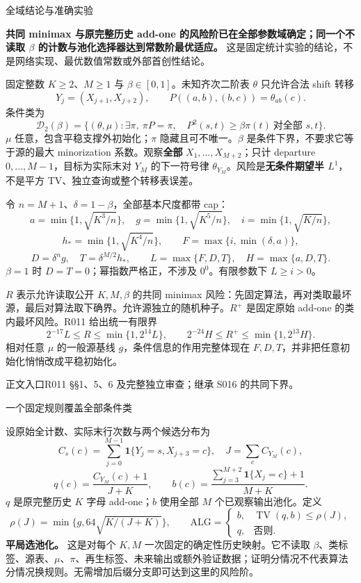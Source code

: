 \documentclass[11pt,a4paper]{article}
\newcommand{\TV}{\operatorname{TV}}\newcommand{\E}{\mathbb E}\newcommand{\Prob}{\mathbb P}
\newcommand{\head}[2]{{\small\sffamily #1}\par\vspace{2pt}{\LARGE\bfseries #2}\par\vspace{5pt}}
\newcommand{\entry}[1]{\vfill{\noindent\small\raggedright 正文入口\quad #1\par}}
\begin{document}
\head{全域结论与准确实验}{二阶条件预测的全参数风险}
\textbf{共同 minimax 与原完整历史 add-one 的风险阶已在全部参数域确定；同一个不读取 $\beta$ 的计数与池化选择器达到常数阶最优适应。} 这是固定统计实验的结论，不是网络实现、最优数值常数或外部首创性结论。

固定整数 $K\ge2$、$M\ge1$ 与 $\beta\in[0,1]$。未知齐次二阶表 $\theta$ 只允许合法 shift 转移
\[
 Y_j=(X_{j+1},X_{j+2}),\qquad P((a,b),(b,c))=\theta_{ab}(c).
\]
条件类为
\[
 \mathcal D_2(\beta)=\{(\theta,\mu):\exists\pi,\ \pi P=\pi,\quad
 P^2(s,t)\ge\beta\pi(t)\ \text{对全部 }s,t\}.
\]
$\mu$ 任意，包含平稳支撑外初始化；$\pi$ 隐藏且可不唯一。$\beta$ 是条件下界，不要求它等于源的最大 minorization 系数。观察\textbf{全部} $X_1,\ldots,X_{M+2}$；只计 departure $0,\ldots,M-1$，目标为实际末对 $Y_M$ 的下一符号律 $\theta_{Y_M}$。风险是\textbf{无条件期望半 $L^1$}，不是平方 TV、独立查询或整个转移表误差。

令 $n=M+1$、$\delta=1-\beta$，全部基本尺度都带 cap：
\[
 a=\min\{1,\sqrt{K^3/n}\},\quad g=\min\{1,\sqrt{K^5/n}\},\quad
 i=\min\{1,\sqrt{K/n}\},
\]
\[
 h_*=\min\{1,\sqrt{K^4/n}\},\qquad F=\max\{i,\min(\delta,a)\},
\]
\[
 D=\delta^n g,\quad T=\delta^{M/2}h_*,\qquad
 L=\max\{F,D,T\},\quad H=\max\{a,D,T\}.
\]
$\beta=1$ 时 $D=T=0$；幂指数严格正，不涉及 $0^0$。有限参数下 $L\ge i>0$。

$R$ 表示允许读取公开 $K,M,\beta$ 的共同 minimax 风险：先固定算法，再对类取最坏源，最后对算法取下确界。允许源独立的随机种子。$R^+$ 是固定原始 add-one 的类内最坏风险。R011 给出统一有限界
\[
 \boxed{2^{-17}L\le R\le\min\{1,2^{14}L\}},\qquad
 \boxed{2^{-24}H\le R^+\le\min\{1,2^{13}H\}}.
\]
相对任意 $\mu$ 的一般源基线 $g$，条件信息的作用完整体现在 $F,D,T$，并非把任意初始化悄悄改成平稳初始化。
\entry{R011 §§1、5、6 及完整独立审查；继承 S016 的共同下界。}
\newpage
\head{一个固定规则覆盖全部条件类}{不读取条件参数的常数适应}
设原始全计数、实际末行次数与两个候选分布为
\[
 C_s(c)=\sum_{j=0}^{M-1}\mathbf1\{Y_j=s,X_{j+3}=c\},\quad
 J=\sum_c C_{Y_M}(c),
\]
\[
 q(c)=\frac{C_{Y_M}(c)+1}{J+K},\qquad
 b(c)=\frac{\sum_{j=3}^{M+2}\mathbf1\{X_j=c\}+1}{M+K}.
\]
$q$ 是原完整历史 $K$ 字母 add-one；$b$ 使用全部 $M$ 个已观察输出池化。定义
\[
 \rho(J)=\min\{g,64\sqrt{K/(J+K)}\},\qquad
 \mathrm{ALG}=\begin{cases}b,&\TV(q,b)\le\rho(J),\\q,&\text{否则}.\end{cases}
\]
\textbf{平局选池化。} 这是对每个 $K,M$ 一次固定的确定性历史映射。它不读取 $\beta$、类标签、源表、$\mu$、$\pi$、再生标签、未来输出或额外验证数据；证明分情况不代表算法分情况换规则。无需增加后缀分支即可达到这里的风险阶。
\end{document}
